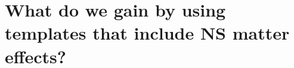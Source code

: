 \documentclass[aps,prd,amsmath,floats,floatfix, twocolumn,
superscriptaddress,nofootinbib,showpacs]{revtex4-1}
\newcommand{\lambdans}{\Lambda_\mathrm{NS}}
\newcommand{\chibh}{\chi_\mathrm{BH}}
\newcommand{\mbh}{m_\mathrm{BH}}
\newcommand{\mns}{m_\mathrm{NS}}
\begin{document}
\section{What do we gain by using templates that include NS matter effects?}\label{s1:PEwithNS}
\end{document}
